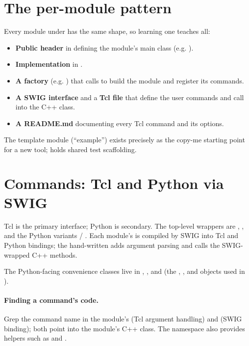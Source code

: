 \section{The per-module pattern}

Every module under  has the same shape, so learning one teaches all:

\begin{itemize}
  \item \textbf{Public header} in  defining the
        module's main class (e.g. ).
  \item \textbf{Implementation} in .
  \item \textbf{A factory}  (e.g. ) that
         calls to build the module and register its commands.
  \item \textbf{A SWIG interface}  and a \textbf{Tcl file}
         that define the user commands and call into the C++ class.
  \item \textbf{A README.md} documenting every Tcl command and its options.
\end{itemize}

The template module  (``example'') exists precisely as the
copy-me starting point for a new tool;  holds shared test scaffolding.

\section{Commands: Tcl and Python via SWIG}

Tcl is the primary interface; Python is secondary. The top-level wrappers are
, , and the Python variants
 / . Each module's  is
compiled by SWIG into Tcl and Python bindings; the hand-written 
adds argument parsing and calls the SWIG-wrapped C++ methods.

The Python-facing convenience classes live in ,
, and  (the , , and
 objects used in ).

\paragraph{Finding a command's code.} Grep the command name in the module's
 (Tcl argument handling) and  (SWIG binding); both point
into the module's C++ class. The  namespace also provides helpers such
as  and .

